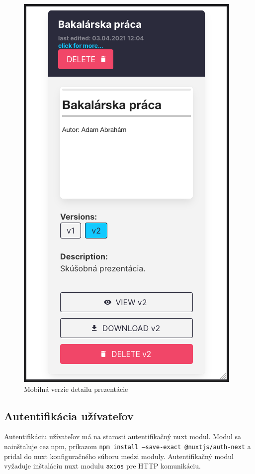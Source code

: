\begin{figure}[!hbt]
\begin{minipage}{.5\textwidth}
  \includegraphics[scale=0.2]{obrazky/mobil_detail.png}
  \caption{Mobilná verzie detailu prezentácie}
  \label{pic:mobil_detail}
\end{minipage}
\end{figure}

\subsection{Autentifikácia užívateľov}
\label{auth}
Autentifikáciu užívateľov má na starosti autentifikačný nuxt modul. Modul sa nainštaluje cez npm, príkazom \texttt{npm install --save-exact @nuxtjs/auth-next} a pridal do nuxt konfiguračného súboru medzi moduly. Autentifikačný modul vyžaduje inštaláciu nuxt modulu \texttt{axios} pre HTTP komunikáciu. 

